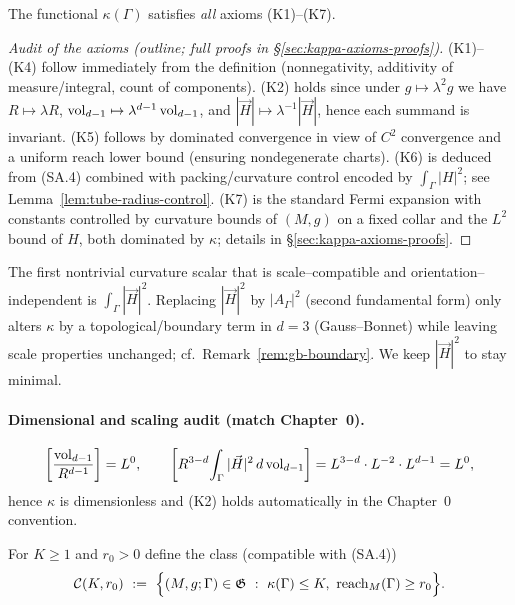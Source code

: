 \begin{lemma}
\label{lem:kappa-axioms}
The functional $\kappa(\Gamma)$ satisfies \emph{all} axioms \textup{(K1)}–\textup{(K7)}.
\end{lemma}

\begin{proof}[Audit of the axioms (outline; full proofs in \S\ref{sec:kappa-axioms-proofs})]
(K1)–(K4) follow immediately from the definition (nonnegativity, additivity of measure/integral, count of components).  
(K2) holds since under $g\mapsto \lambda^2 g$ we have $R\mapsto \lambda R$, $\operatorname{vol}_{d-1}\mapsto \lambda^{d-1}\operatorname{vol}_{d-1}$, and $|\vec H|\mapsto \lambda^{-1}|\vec H|$, hence each summand is invariant.  
(K5) follows by dominated convergence in view of $C^2$ convergence and a uniform reach lower bound (ensuring nondegenerate charts).  
(K6) is deduced from (SA.4) combined with packing/curvature control encoded by $\int_\Gamma |H|^2$; see Lemma~\ref{lem:tube-radius-control}.  
(K7) is the standard Fermi expansion with constants controlled by curvature bounds of $(M,g)$ on a fixed collar and the $L^2$ bound of $H$, both dominated by $\kappa$; details in \S\ref{sec:kappa-axioms-proofs}.
\end{proof}

\begin{remark}
The first nontrivial curvature scalar that is scale–compatible and orientation–independent is $\int_\Gamma |\vec H|^2$. Replacing $|\vec H|^2$ by $|A_\Gamma|^2$ (second fundamental form) only alters $\kappa$ by a topological/boundary term in $d=3$ (Gauss–Bonnet) while leaving scale properties unchanged; cf.\ Remark~\ref{rem:gb-boundary}. We keep $|\vec H|^2$ to stay minimal.
\end{remark}

\paragraph{Dimensional and scaling audit (match Chapter~0).}
\[
\left[\frac{\operatorname{vol}_{d-1}}{R^{d-1}}\right]=L^0,\qquad
\left[R^{3-d}\!\int_\Gamma |\vec H|^2\,d\operatorname{vol}_{d-1}\right]=L^{3-d}\cdot L^{-2}\cdot L^{d-1}=L^0,
\]
hence $\kappa$ is dimensionless and (K2) holds automatically in the Chapter~0 convention.

\begin{definition}
\label{def:complexity-class}
For $K\ge 1$ and $r_0>0$ define the class (compatible with (SA.4))
\[
\mathcal{C}(K,r_0)\ :=\ \Big\{(M,g;\Gamma)\in\mathfrak{G}\ :\ \kappa(\Gamma)\le K,\ \reach_M(\Gamma)\ge r_0\Big\}.
\]
\end{definition}

